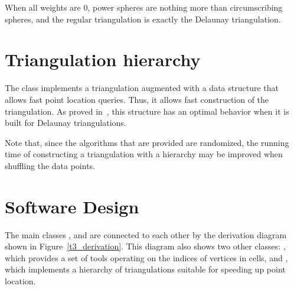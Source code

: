 When all weights are 0, power spheres are nothing more than
circumscribing spheres, and the regular triangulation is exactly the
Delaunay triangulation.

\section{Triangulation hierarchy} 

The class  implements a
triangulation augmented with a data structure that allows fast point
location queries. Thus, it allows fast construction of the
triangulation. As proved in~\cite{d-iirdt-98}, this structure has an
optimal behavior when it is built for Delaunay triangulations.

Note that, since the algorithms that are provided are randomized, the
running time of constructing a triangulation with a hierarchy may be
improved when shuffling the data points.

\section{Software Design}
\label{Triangulation3-sec-design}

The main classes ,  and
 are connected to each other by the
derivation diagram shown in Figure~\ref{t3_derivation}.  This diagram
also shows two other classes: , which provides
a set of tools operating on the indices of vertices in cells,
and , which implements a hierarchy of
triangulations suitable for speeding up point location.

